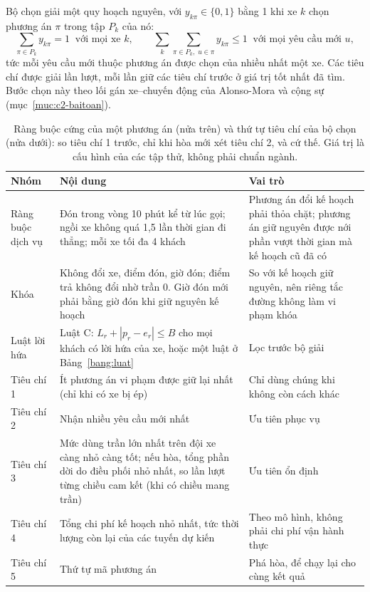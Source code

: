 Bộ chọn giải một quy hoạch nguyên, với $y_{k\pi} \in \{0, 1\}$ bằng 1 khi xe $k$ chọn phương án $\pi$ trong
tập $P_k$ của nó:
\begin{equation}
\sum_{\pi \in P_k} y_{k\pi} = 1 \;\;\text{với mọi xe } k, \qquad
\sum_{k} \sum_{\pi \in P_k,\; u \in \pi} y_{k\pi} \le 1 \;\;\text{với mọi yêu cầu mới } u ,
\label{eq:chon}
\end{equation}
tức mỗi yêu cầu mới thuộc phương án được chọn của nhiều nhất một xe. Các tiêu chí được giải lần lượt, mỗi lần giữ
các tiêu chí trước ở giá trị tốt nhất đã tìm. Bước chọn này theo lối gán xe--chuyến động của Alonso-Mora và cộng
sự~\cite{alonsomora2017} (mục~\ref{muc:c2-baitoan}).

\begin{table}[htbp]
\centering
\caption[Ràng buộc cứng và thứ tự tiêu chí của bộ chọn]{Ràng buộc cứng của một phương án (nửa trên) và thứ tự tiêu chí của bộ chọn (nửa dưới): so tiêu chí 1
trước, chỉ khi hòa mới xét tiêu chí 2, và cứ thế. Giá trị là cấu hình của các tập thử, không phải chuẩn ngành.}
\label{bang:rangbuoc}
\small
\begin{tabular}{@{}p{2.4cm}p{7.6cm}p{4.8cm}@{}}
\toprule
\textbf{Nhóm} & \textbf{Nội dung} & \textbf{Vai trò}\\
\midrule
Ràng buộc dịch vụ & Đón trong vòng 10 phút kể từ lúc gọi; ngồi xe không quá 1,5 lần thời gian đi thẳng; mỗi
xe tối đa 4 khách & Phương án đổi kế hoạch phải thỏa chặt; phương án giữ nguyên được nới phần vượt thời gian
mà kế hoạch cũ đã có\\
Khóa & Không đổi xe, điểm đón, giờ đón; điểm trả không đổi nhờ trần 0. Giờ đón mới phải bằng giờ đón khi giữ
nguyên kế hoạch & So với kế hoạch giữ nguyên, nên riêng tắc đường không làm vi phạm khóa\\
Luật lời hứa & Luật C: $L_r + |p_r - e_r| \le B$ cho mọi khách có lời hứa của xe, hoặc một luật ở
Bảng~\ref{bang:luat} & Lọc trước bộ giải\\
\midrule
Tiêu chí 1 & Ít phương án vi phạm được giữ lại nhất (chỉ khi có xe bị ép) & Chỉ dùng chúng khi không còn cách
khác\\
Tiêu chí 2 & Nhận nhiều yêu cầu mới nhất & Ưu tiên phục vụ\\
Tiêu chí 3 & Mức dùng trần lớn nhất trên đội xe càng nhỏ càng tốt; nếu hòa, tổng phần dời do điều phối nhỏ nhất,
so lần lượt từng chiều cam kết (khi có chiều mang trần) & Ưu tiên ổn định\\
Tiêu chí 4 & Tổng chi phí kế hoạch nhỏ nhất, tức thời lượng còn lại của các tuyến dự kiến & Theo mô hình, không
phải chi phí vận hành thực\\
Tiêu chí 5 & Thứ tự mã phương án & Phá hòa, để chạy lại cho cùng kết quả\\
\bottomrule
\end{tabular}
\end{table}

